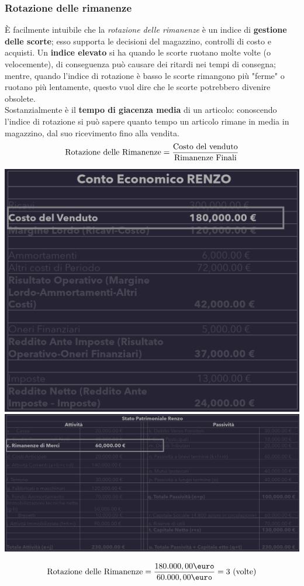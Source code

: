\documentclass{article}
\begin{document}
\subsubsection{Rotazione delle rimanenze}
È facilmente intuibile che la \textit{rotazione delle rimanenze} è un indice di \textbf{gestione delle scorte}; esso supporta le decisioni del magazzino, controlli di costo e acquisti. Un \textbf{indice elevato} si ha quando le scorte ruotano molte volte (o velocemente), di conseguenza può causare dei ritardi nei tempi di consegna; mentre, quando l'indice di rotazione è basso le scorte rimangono più "ferme" o ruotano più lentamente, questo vuol dire che le scorte potrebbero divenire obsolete.\\
Sostanzialmente è il \textbf{tempo di giacenza media} di un articolo:
conoscendo l'indice di rotazione si può sapere quanto tempo un articolo rimane in media in magazzino, dal suo ricevimento fino alla vendita.
\[
    \text{Rotazione delle Rimanenze} = \frac{\text{Costo del venduto}}{\text{Rimanenze Finali}}
\]
\begin{center}
    \includegraphics[scale=0.3]{Image/RotazioneRimanenze_1.png}
    \includegraphics[scale=0.3]{Image/RotazioneRimanenze_2.png}
\end{center}
\[
    \T{Rotazione delle Rimanenze} = \frac{180.000,00\T{\euro}}{60.000,00\T{\euro}} = 3 \T{ (volte)}
\]
\end{document}
